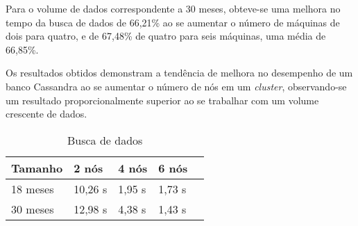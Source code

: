 Para o volume de dados correspondente a 30 meses, obteve-se uma melhora no tempo da busca de dados de 66,21\% ao se aumentar o número de máquinas de dois para quatro, e de 67,48\% de quatro para seis máquinas, uma média de 66,85\%. 

Os resultados obtidos demonstram a tendência de melhora no desempenho de um banco Cassandra ao se aumentar o número de nós em um \emph{cluster}, observando-se um resultado proporcionalmente superior ao se trabalhar com um volume crescente de dados.

\begin{table}[]
	\centering
	\caption{Busca de dados}
	\label{tab:select_busca}
	\begin{tabular}{lllll}
		\textbf{Tamanho} & \textbf{2 nós} & \textbf{4 nós} & \textbf{6 nós} \\ \hline
		18 meses         & 10,26 s        & 1,95 s        & 1,73 s        \\ \hline
		30 meses         & 12,98 s        & 4,38 s        & 1,43 s         \\ \hline
	\end{tabular}
\end{table}

